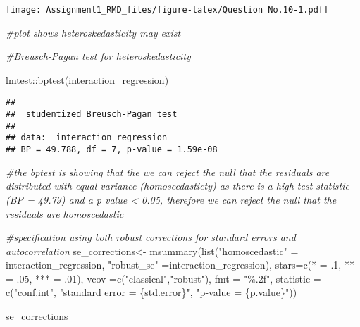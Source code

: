 \documentclass[
]{article}
\newenvironment{Shaded}{\begin{snugshade}}{\end{snugshade}}
\newcommand{\AttributeTok}[1]{\textcolor[rgb]{0.77,0.63,0.00}{#1}}
\newcommand{\CommentTok}[1]{\textcolor[rgb]{0.56,0.35,0.01}{\textit{#1}}}
\newcommand{\DecValTok}[1]{\textcolor[rgb]{0.00,0.00,0.81}{#1}}
\newcommand{\FunctionTok}[1]{\textcolor[rgb]{0.00,0.00,0.00}{#1}}
\newcommand{\NormalTok}[1]{#1}
\newcommand{\OtherTok}[1]{\textcolor[rgb]{0.56,0.35,0.01}{#1}}
\newcommand{\SpecialCharTok}[1]{\textcolor[rgb]{0.00,0.00,0.00}{#1}}
\newcommand{\StringTok}[1]{\textcolor[rgb]{0.31,0.60,0.02}{#1}}
\begin{document}
\texttt{[image: Assignment1\_RMD\_files/figure-latex/Question No.10-1.pdf]}

\begin{Shaded}
\begin{Highlighting}[]
\CommentTok{\#plot shows heteroskedasticity may exist}

\CommentTok{\#Breusch{-}Pagan test for heteroskedasticity }

\NormalTok{lmtest}\SpecialCharTok{::}\FunctionTok{bptest}\NormalTok{(interaction\_regression)}
\end{Highlighting}
\end{Shaded}

\begin{verbatim}
## 
##  studentized Breusch-Pagan test
## 
## data:  interaction_regression
## BP = 49.788, df = 7, p-value = 1.59e-08
\end{verbatim}

\begin{Shaded}
\begin{Highlighting}[]
\CommentTok{\#the bptest is showing that the we can reject the null that the residuals are distributed with equal variance (homoscedasticty) as there is a high test statistic (BP = 49.79) and a p value \textless{} 0.05, therefore we can reject the null that the residuals are homoscedastic}


\CommentTok{\#specification using both robust corrections for standard errors and autocorrelation}
\NormalTok{se\_corrections}\OtherTok{\textless{}{-}} \FunctionTok{msummary}\NormalTok{(}\FunctionTok{list}\NormalTok{(}\StringTok{"homoscedastic"} \OtherTok{=}\NormalTok{ interaction\_regression,}
                               \StringTok{"robust\_se"} \OtherTok{=}\NormalTok{interaction\_regression),}
          \AttributeTok{stars=}\FunctionTok{c}\NormalTok{(}\StringTok{\textquotesingle{}*\textquotesingle{}} \OtherTok{=}\NormalTok{ .}\DecValTok{1}\NormalTok{, }\StringTok{\textquotesingle{}**\textquotesingle{}} \OtherTok{=}\NormalTok{ .}\DecValTok{05}\NormalTok{, }\StringTok{\textquotesingle{}***\textquotesingle{}} \OtherTok{=}\NormalTok{ .}\DecValTok{01}\NormalTok{), }
          \AttributeTok{vcov =}\FunctionTok{c}\NormalTok{(}\StringTok{"classical"}\NormalTok{,}\StringTok{"robust"}\NormalTok{),}
          \AttributeTok{fmt =} \StringTok{"\%.2f"}\NormalTok{, }\AttributeTok{statistic =} \FunctionTok{c}\NormalTok{(}\StringTok{"conf.int"}\NormalTok{, }\StringTok{"standard error = \{std.error\}"}\NormalTok{, }
                                            \StringTok{"p{-}value = \{p.value\}"}\NormalTok{))}

\NormalTok{se\_corrections}
\end{Highlighting}
\end{Shaded}
\end{document}
